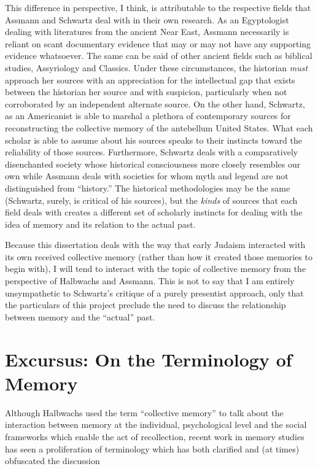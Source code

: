 This difference in perspective, I think, is attributable to the
respective fields that Assmann and Schwartz deal with in their own
research. As an Egyptologist dealing with literatures from the ancient
Near East, Assmann necessarily is reliant on scant documentary evidence
that may or may not have any supporting evidence whatsoever. The same
can be said of other ancient fields such as biblical studies,
Assyriology and Classics. Under these circumstances, the historian
\emph{must} approach her sources with an appreciation for the
intellectual gap that exists between the historian her source and with
suspicion, particularly when not corroborated by an independent
alternate source. On the other hand, Schwartz, as an Americanist is able
to marshal a plethora of contemporary sources for reconstructing the
collective memory of the antebellum United States. What each scholar is
able to assume about his sources speaks to their instincts toward the
reliability of those sources. Furthermore, Schwartz deals with a
comparatively disenchanted society whose historical consciousness more
closely resembles our own while Assmann deals with societies for whom
myth and legend are not distinguished from ``history.'' The historical
methodologies may be the same (Schwartz, surely, is critical of his
sources), but the \emph{kinds} of sources that each field deals with
creates a different set of scholarly instincts for dealing with the idea
of memory and its relation to the actual past.

Because this dissertation deals with the way that early Judaism
interacted with its own received collective memory (rather than how it
created those memories to begin with), I will tend to interact with the
topic of collective memory from the perspective of Halbwachs and
Assmann. This is not to say that I am entirely unsympathetic to
Schwartz's critique of a purely presentist approach, only that the
particulars of this project preclude the need to discuss the
relationship between memory and the ``actual'' past.

\hypertarget{excursus-on-the-terminology-of-memory}{%
\section{Excursus: On the Terminology of
Memory}\label{excursus-on-the-terminology-of-memory}}

Although Halbwachs used the term ``collective memory'' to talk about the
interaction between memory at the individual, psychological level and
the social frameworks which enable the act of recollection, recent work
in memory studies has seen a proliferation of terminology which has both
clarified and (at times) obfuscated the discussion

